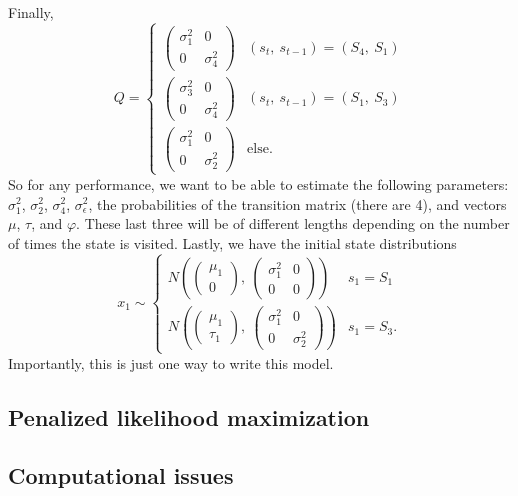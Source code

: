 \documentclass[12pt]{article}
\begin{document}
Finally, 
\[
Q=\begin{cases}\begin{pmatrix} \sigma^2_1 &
    0\\0&\sigma^2_4\end{pmatrix} & (s_t,\ s_{t-1})=(S_4,\ S_1)\\
                \begin{pmatrix} \sigma^2_3 &
                        0\\0&\sigma^2_4\end{pmatrix} & (s_t,\ s_{t-1})=(S_1,\ S_3)\\
\begin{pmatrix} \sigma^2_1 &
    0\\0&\sigma^2_2\end{pmatrix} & \textrm{else}.
\end{cases}
\] 
So for any performance, we want to be able to estimate
the following parameters: $\sigma_1^2$, $\sigma_2^2$, $\sigma^2_4$,
$\sigma_\epsilon^2$, the probabilities of the transition matrix (there
are 4), and vectors $\mu$, $\tau$, and $\varphi$. These last three
will be of different lengths depending on the number of times the
state is visited. Lastly, we have the initial state distributions
\[
x_1\sim\begin{cases} N\left( \begin{pmatrix}\mu_1\\0\end{pmatrix}
  ,\ \begin{pmatrix} \sigma^2_1 & 0\\0 & 0
  \end{pmatrix}\right) & s_1=S_1\\
N\left( \begin{pmatrix}\mu_1\\\tau_1\end{pmatrix}
  ,\ \begin{pmatrix} \sigma^2_1 & 0\\0 & \sigma^2_2
  \end{pmatrix}\right) & s_1=S_3.\end{cases}
\]
Importantly, this is just one way to write this
model.

\subsection{Penalized likelihood maximization}

\subsection{Computational issues}
\end{document}
